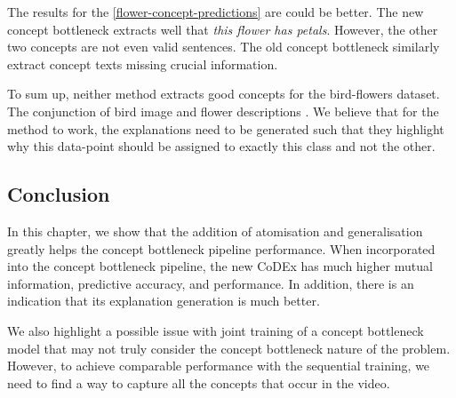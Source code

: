 The results for the \ref{flower-concept-predictions} are could be better.
The new concept bottleneck extracts well that \emph{this flower has petals}.
However, the other two concepts are not even valid sentences.
The old concept bottleneck similarly extract concept texts missing crucial information.


To sum up, neither method extracts good concepts for the bird-flowers dataset.
The conjunction of bird image and flower descriptions .
We believe that for the method to work, the explanations need to be generated such that they highlight why this data-point should be assigned to exactly this class and not the other.


\subsection{Conclusion}

In this chapter, we show that the addition of atomisation and generalisation greatly helps the concept bottleneck pipeline performance.
When incorporated into the concept bottleneck pipeline, the new CoDEx has much higher mutual information,  predictive accuracy, and performance.
In addition, there is an indication that its explanation generation is much better.

We also highlight a possible issue with joint training of a concept bottleneck model that may not truly consider the concept bottleneck nature of the problem.
However, to achieve comparable performance with the sequential training, we need to find a way to capture all the concepts that occur in the video.

